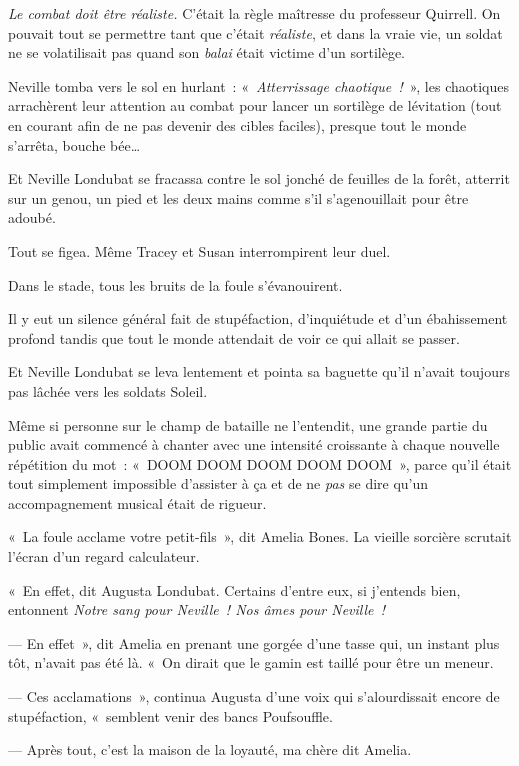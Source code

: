 \emph{Le combat doit être réaliste.} C'était la règle maîtresse du professeur Quirrell.
On pouvait tout se permettre tant que c'était \emph{réaliste}, et dans la vraie vie, un soldat ne se volatilisait pas quand son \emph{balai} était victime d'un sortilège.

Neville tomba vers le sol en hurlant~: «~\emph{Atterrissage chaotique~!}~», les chaotiques arrachèrent leur attention au combat pour lancer un sortilège de lévitation (tout en courant afin de ne pas devenir des cibles faciles), presque tout le monde s'arrêta, bouche bée…

Et Neville Londubat se fracassa contre le sol jonché de feuilles de la forêt, atterrit sur un genou, un pied et les deux mains comme s'il s'agenouillait pour être adoubé.

Tout se figea.
Même Tracey et Susan interrompirent leur duel.

Dans le stade, tous les bruits de la foule s'évanouirent.

Il y eut un silence général fait de stupéfaction, d'inquiétude et d'un ébahissement profond tandis que tout le monde attendait de voir ce qui allait se passer.

Et Neville Londubat se leva lentement et pointa sa baguette qu'il n'avait toujours pas lâchée vers les soldats Soleil.

Même si personne sur le champ de bataille ne l'entendit, une grande partie du public avait commencé à chanter avec une intensité croissante à chaque nouvelle répétition du mot~: «~DOOM DOOM DOOM DOOM DOOM~», parce qu'il était tout simplement impossible d'assister à ça et de ne \emph{pas} se dire qu'un accompagnement musical était de rigueur.

«~La foule acclame votre petit-fils~», dit Amelia Bones.
La vieille sorcière scrutait l'écran d'un regard calculateur.

«~En effet, dit Augusta Londubat.
Certains d'entre eux, si j'entends bien, entonnent \emph{Notre sang pour Neville~!
Nos âmes pour Neville~!}

--- En effet~», dit Amelia en prenant une gorgée d'une tasse qui, un instant plus tôt, n'avait pas été là.
«~On dirait que le gamin est taillé pour être un meneur.

--- Ces acclamations~», continua Augusta d'une voix qui s'alourdissait encore de stupéfaction, «~semblent venir des bancs Poufsouffle.

--- Après tout, c'est la maison de la loyauté, ma chère dit Amelia.

